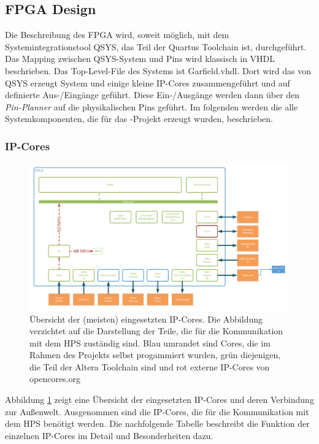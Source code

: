 \subsection{\ac{FPGA} Design}
Die Beschreibung des \ac{FPGA} wird, soweit möglich, mit dem Systemintegrationstool QSYS, das Teil der Quartus Toolchain ist, durchgeführt. Das Mapping zwischen QSYS-System und Pins wird klassisch in VHDL beschrieben. Das Top-Level-File des Systems ist Garfield.vhdl.  Dort wird das von QSYS erzeugt System und einige kleine \ac{IP}-Cores zusammengeführt und auf definierte Aus-/Eingänge geführt. Diese Ein-/Ausgänge werden dann über den \textit{Pin-Planner} auf die physikalischen Pins geführt. Im folgenden werden die alle Systemkomponenten, die für das \Projectname-Projekt erzeugt wurden, beschrieben.

\subsubsection{\ac{IP}-Cores}

\begin{figure}
	\includegraphics[angle=90, height=0.9\textheight]{Abb/Garfield_FPGA_Design_only_FPGA.pdf}
	\caption{Übersicht der (meisten) eingesetzten \ac{IP}-Cores. Die Abbildung verzichtet auf die Darstellung der Teile, die für die Kommunikation mit dem \ac{HPS} zuständig sind. Blau umrandet sind Cores, die im Rahmen des Projekts selbst progammiert wurden, grün diejenigen, die Teil der Altera Toolchain sind und rot externe IP-Cores von opencores.org}
	\label{FPGA_IP_FPGA_only}
\end{figure}

Abbildung \ref{FPGA_IP_FPGA_only} zeigt eine Übersicht der eingesetzten \ac{IP}-Cores und deren Verbindung zur Außenwelt. Ausgenommen sind die \ac{IP}-Cores, die für die Kommunikation mit dem \ac{HPS} benötigt werden. Die nachfolgende Tabelle beschreibt die Funktion der einzelnen IP-Cores im Detail und Besonderheiten dazu.

